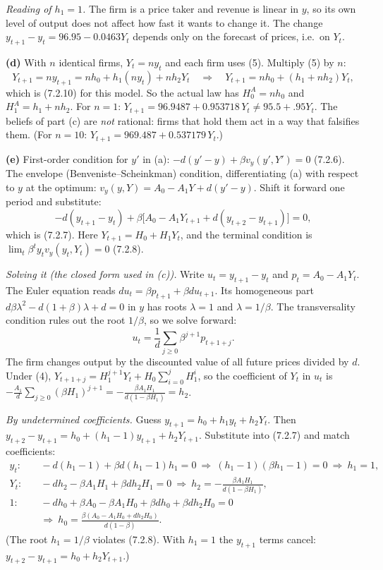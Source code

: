 \documentclass[12pt, letterpaper]{article}
\begin{document}
\begin{tcolorbox}[oddbox,title={Exercise 7.1 \quad A competitive firm}]
\emph{Reading of $h_1=1$.} The firm is a price taker and revenue is linear in $y$, so its own level
of output does not affect how fast it wants to change it. The change $y_{t+1}-y_t=96.95-0.0463Y_t$
depends only on the forecast of prices, i.e.\ on $Y_t$.

\textbf{(d)} With $n$ identical firms, $Y_t=ny_t$ and each firm uses (5). Multiply (5) by $n$:
\[
Y_{t+1}=ny_{t+1}=nh_0+h_1(ny_t)+nh_2Y_t
\quad\Longrightarrow\quad
\boxed{Y_{t+1}=nh_0+(h_1+nh_2)Y_t,}
\]
which is (7.2.10) for this model. So the actual law has $H_0^A=nh_0$ and $H_1^A=h_1+nh_2$. For
$n=1$: $Y_{t+1}=96.9487+0.953718\,Y_t\neq95.5+.95Y_t$. The beliefs of part (c) are \emph{not}
rational: firms that hold them act in a way that falsifies them. (For $n=10$:
$Y_{t+1}=969.487+0.537179\,Y_t$.)

\textbf{(e)} First-order condition for $y'$ in (a): $-d(y'-y)+\beta v_y(y',Y')=0$ (7.2.6). The
envelope (Benveniste--Scheinkman) condition, differentiating (a) with respect to $y$ at the optimum:
$v_y(y,Y)=A_0-A_1Y+d(y'-y)$. Shift it forward one period and substitute:
\[
\boxed{-d(y_{t+1}-y_t)+\beta\big[A_0-A_1Y_{t+1}+d(y_{t+2}-y_{t+1})\big]=0,}
\]
which is (7.2.7). Here $Y_{t+1}=H_0+H_1Y_t$, and the terminal condition is
$\lim_t\beta^ty_tv_y(y_t,Y_t)=0$ (7.2.8).

\emph{Solving it (the closed form used in (c)).} Write $u_t=y_{t+1}-y_t$ and $p_t=A_0-A_1Y_t$.
The Euler equation reads $du_t=\beta p_{t+1}+\beta du_{t+1}$. Its homogeneous part
$d\beta\lambda^2-d(1+\beta)\lambda+d=0$ in $y$ has roots $\lambda=1$ and $\lambda=1/\beta$. The
transversality condition rules out the root $1/\beta$, so we solve forward:
\[
u_t=\frac1d\sum_{j\ge0}\beta^{j+1}p_{t+1+j}.
\]
The firm changes output by the discounted value of all future prices divided by $d$. Under (4),
$Y_{t+1+j}=H_1^{j+1}Y_t+H_0\sum_{i=0}^{j}H_1^i$, so the coefficient of $Y_t$ in $u_t$ is
$-\frac{A_1}{d}\sum_{j\ge0}(\beta H_1)^{j+1}=-\frac{\beta A_1H_1}{d(1-\beta H_1)}=h_2$.

\emph{By undetermined coefficients.} Guess $y_{t+1}=h_0+h_1y_t+h_2Y_t$. Then
$y_{t+2}-y_{t+1}=h_0+(h_1-1)y_{t+1}+h_2Y_{t+1}$. Substitute into (7.2.7) and match coefficients:
\begin{align*}
y_t:&\quad -d(h_1-1)+\beta d(h_1-1)h_1=0\ \Rightarrow\ (h_1-1)(\beta h_1-1)=0\ \Rightarrow\ h_1=1,\\
Y_t:&\quad -dh_2-\beta A_1H_1+\beta dh_2H_1=0\ \Rightarrow\ h_2=-\frac{\beta A_1H_1}{d(1-\beta H_1)},\\
1:&\quad -dh_0+\beta A_0-\beta A_1H_0+\beta dh_0+\beta dh_2H_0=0\\
&\quad\Rightarrow\ h_0=\frac{\beta(A_0-A_1H_0+dh_2H_0)}{d(1-\beta)}.
\end{align*}
(The root $h_1=1/\beta$ violates (7.2.8). With $h_1=1$ the $y_{t+1}$ terms cancel: $y_{t+2}-y_{t+1}=h_0+h_2Y_{t+1}$.)


\end{tcolorbox}
\end{document}

